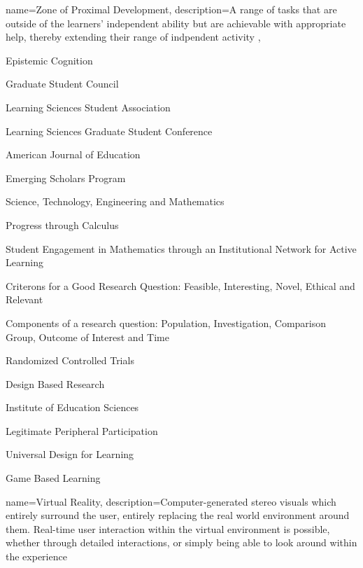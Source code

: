 {
	name={Zone of Proximal Development},
	description={A range of tasks that are outside of the learners' independent ability but are achievable with appropriate help, thereby extending their range of indpendent activity \parencite{reiser_scaffolding_2014}},
}



{Epistemic Cognition}

{Graduate Student Council}

{Learning Sciences Student Association}

{Learning Sciences Graduate Student Conference}

{American Journal of Education}

{Emerging Scholars Program}

{Science, Technology, Engineering and Mathematics}

{Progress through Calculus}

{Student Engagement in Mathematics through an Institutional Network for Active Learning}

{Criterons for a Good Research Question: Feasible, Interesting, Novel, Ethical and Relevant}

{Components of a research question: Population, Investigation, Comparison Group, Outcome of Interest and Time}

{Randomized Controlled Trials}

{Design Based Research}

{Institute of Education Sciences}

{Legitimate Peripheral Participation}

{Universal Design for Learning} 

{Game Based Learning}

{
	name={Virtual Reality},
	description={Computer-generated stereo visuals which entirely surround the user, entirely replacing the real world environment around them. Real-time user interaction within the virtual environment is possible, whether through detailed interactions, or simply being able to look around within the experience \parencite{noauthor_what_2019} }
}

